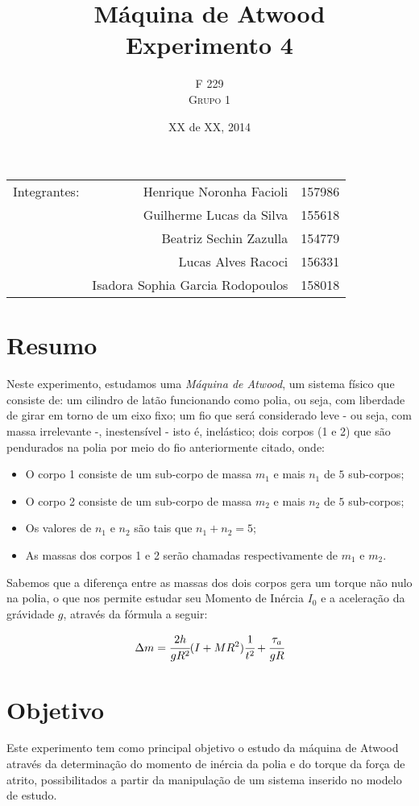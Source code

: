 \documentclass{article}
\title{Máquina de Atwood \\ Experimento 4} %
\author{F 229 \\ \textsc{Grupo 1}}
\date{XX de XX, 2014}
\begin{document}
\maketitle

\begin{center}
	\begin{tabular}{l r l}
		Integrantes: & Henrique Noronha Facioli & 157986 \\
		& Guilherme Lucas da Silva & 155618 \\
		& Beatriz Sechin Zazulla & 154779 \\
		& Lucas Alves Racoci & 156331 \\
		& Isadora Sophia Garcia Rodopoulos & 158018 \\
	\end{tabular}
\end{center}


\section{Resumo}
Neste experimento, estudamos uma \emph{Máquina de Atwood}, um sistema físico que consiste de: um cilindro de latão funcionando como polia, ou seja, com liberdade de girar em torno de um eixo fixo; um fio que será considerado leve - ou seja, com massa irrelevante -, inestensível - isto é, inelástico; dois corpos (1 e 2) que são pendurados na polia por meio do fio anteriormente citado, onde:
\begin{itemize} 
	\item O corpo 1 consiste de um sub-corpo de massa ${m}_{1}$ e mais $n_{1}$ de $5$ sub-corpos; 
	\item O corpo 2 consiste de um sub-corpo de massa ${m}_{2}$ e mais $n_{2}$ de $5$ sub-corpos; 
	\item Os valores de $n_{1}$ e $n_{2}$ são tais que $n_{1}+n_{2}=5$; 
	\item As massas dos corpos 1 e 2 serão chamadas respectivamente de $m_{1}$ e $m_{2}$.
\end {itemize} 

Sabemos que a diferença entre as massas dos dois corpos gera um torque não nulo na polia, o que nos permite estudar seu Momento de Inércia $I_{0}$ e a aceleração da grávidade $g$, através da fórmula a seguir:

\[
\Delta m=\cfrac{2h}{gR^{2}}(I+MR^{2})\ensuremath{\cfrac{1}{t^{2}}}+\cfrac{\tau_{a}}{gR}
\]


\section{Objetivo}
Este experimento tem como principal objetivo o estudo da máquina de Atwood através da determinação do momento de inércia da polia e do torque da força de atrito, possibilitados a partir da manipulação de um sistema inserido no modelo de estudo.
\end{document}
